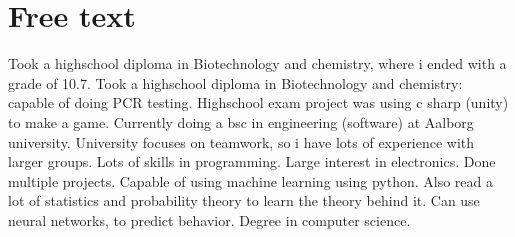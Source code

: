 \section*{Free text}
Took a highschool diploma in Biotechnology and chemistry, where i ended with a grade of 10.7.
Took a highschool diploma in Biotechnology and chemistry: capable of doing PCR testing.
Highschool exam project was using c sharp (unity) to make a game.
Currently doing a bsc in engineering (software) at Aalborg university.
University focuses on teamwork, so i have lots of experience with larger groups.
Lots of skills in programming.
Large interest in electronics. Done multiple projects.
Capable of using machine learning using python. Also read a lot of statistics and probability theory to learn the theory behind it. Can use neural networks, to predict behavior.
Degree in computer science.

